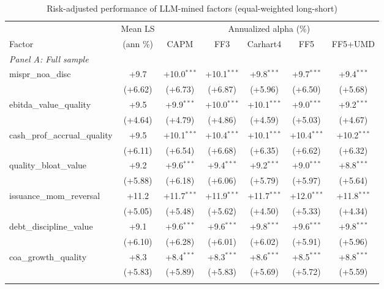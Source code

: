 \begin{table}[htbp]\centering
\caption{Risk-adjusted performance of LLM-mined factors (equal-weighted long-short)}
\label{tab:alphas_ew}
\begin{threeparttable}\footnotesize
\begin{tabular}{lcccccc}
\toprule
 & Mean LS & \multicolumn{5}{c}{Annualized alpha (\%)} \\
\cmidrule(lr){3-7}
Factor & (ann \%) & CAPM & FF3 & Carhart4 & FF5 & FF5+UMD \\
\midrule
\multicolumn{7}{l}{\textit{Panel A: Full sample}} \\
\addlinespace
mispr\_noa\_disc & +9.7 & +10.0$^{***}$ & +10.1$^{***}$ & +9.8$^{***}$ & +9.7$^{***}$ & +9.4$^{***}$ \\
 & (+6.62) & (+6.73) & (+6.87) & (+5.96) & (+6.50) & (+5.68) \\
\addlinespace
ebitda\_value\_quality & +9.5 & +9.9$^{***}$ & +10.0$^{***}$ & +10.1$^{***}$ & +9.0$^{***}$ & +9.2$^{***}$ \\
 & (+4.64) & (+4.79) & (+4.86) & (+4.59) & (+5.03) & (+4.67) \\
\addlinespace
cash\_prof\_accrual\_quality & +9.5 & +10.1$^{***}$ & +10.4$^{***}$ & +10.1$^{***}$ & +10.4$^{***}$ & +10.2$^{***}$ \\
 & (+6.11) & (+6.54) & (+6.68) & (+6.35) & (+6.62) & (+6.32) \\
\addlinespace
quality\_bloat\_value & +9.2 & +9.6$^{***}$ & +9.4$^{***}$ & +9.2$^{***}$ & +9.0$^{***}$ & +8.8$^{***}$ \\
 & (+5.88) & (+6.18) & (+6.06) & (+5.79) & (+5.97) & (+5.64) \\
\addlinespace
issuance\_mom\_reversal & +11.2 & +11.7$^{***}$ & +11.9$^{***}$ & +11.7$^{***}$ & +12.0$^{***}$ & +11.8$^{***}$ \\
 & (+5.05) & (+5.48) & (+5.62) & (+4.50) & (+5.33) & (+4.34) \\
\addlinespace
debt\_discipline\_value & +9.1 & +9.6$^{***}$ & +9.6$^{***}$ & +9.8$^{***}$ & +9.6$^{***}$ & +9.8$^{***}$ \\
 & (+6.10) & (+6.28) & (+6.01) & (+6.02) & (+5.91) & (+5.96) \\
\addlinespace
coa\_growth\_quality & +8.3 & +8.4$^{***}$ & +8.3$^{***}$ & +8.6$^{***}$ & +8.5$^{***}$ & +8.8$^{***}$ \\
 & (+5.83) & (+5.89) & (+5.83) & (+5.69) & (+5.72) & (+5.59) \\
\addlinespace
\midrule
\multicolumn{7}{l}{\textit{Panel B: Out-of-sample (post-2000-12-31)}} \\

\end{tabular}
\end{threeparttable}
\end{table}
